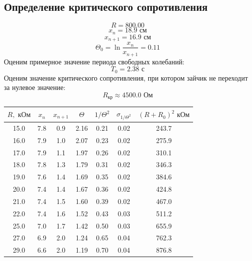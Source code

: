\documentclass[a4paper, 12pt]{article}
\begin{document}
\subsection*{Определение критического сопротивления}
$$R = 800.00$$
$$x_n = 18.9 \text{ см}$$
$$x_{n+1} = 16.9 \text{ см}$$
$$\Theta_0 = \ln \dfrac{x_n}{x_{n+1}} = 0.11$$	
Оценим примерное значение периода свободных колебаний:
$$T_0 = 2.38 \text{ с}$$
Оценим значение критического сопротивления, при котором зайчик не переходит за нулевое значение:
$$R_{\text{кр}} \approx 4500.0 \text{ Ом}$$

\begin{table}[H]
\centering
\begin{tabular}{|c|c|c|c|c|c|c|}
\hline
$R, \text{ кОм}$ & $x_n$ & $x_{n+1}$ & $\Theta$ & $1/\Theta^2$ & $\sigma_{1/\Theta^2}$ & $(R+R_0)^2 \text{ кОм}$ \\ \hline
15.0             & 7.8   & 0.9       & 2.16     & 0.21         & 0.02                  & 243.7                   \\ \hline
16.0             & 7.9   & 1.0       & 2.07     & 0.23         & 0.02                  & 275.9                   \\ \hline
17.0             & 7.9   & 1.1       & 1.97     & 0.26         & 0.02                  & 310.1                   \\ \hline
18.0             & 7.8   & 1.3       & 1.79     & 0.31         & 0.02                  & 346.3                   \\ \hline
19.0             & 7.6   & 1.4       & 1.69     & 0.35         & 0.02                  & 384.6                   \\ \hline
20.0             & 7.4   & 1.4       & 1.67     & 0.36         & 0.02                  & 424.8                   \\ \hline
21.0             & 7.4   & 1.5       & 1.60     & 0.39         & 0.02                  & 467.0                   \\ \hline
22.0             & 7.4   & 1.6       & 1.52     & 0.43         & 0.03                  & 511.2                   \\ \hline
25.0             & 7.0   & 1.7       & 1.42     & 0.50         & 0.03                  & 655.9                   \\ \hline
27.0             & 6.9   & 2.0       & 1.24     & 0.65         & 0.04                  & 762.3                   \\ \hline
29.0             & 6.6   & 2.0       & 1.19     & 0.70         & 0.04                  & 876.8                   \\ \hline

\end{tabular}
\end{table}
\end{document}
